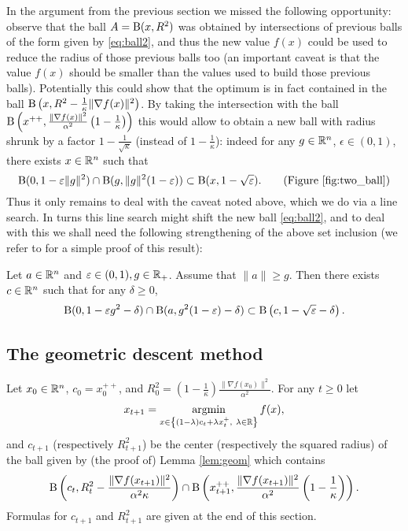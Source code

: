 In the argument from the previous section we missed the following opportunity: observe that the ball $A=\mathrm{B}(x,R^2)$ was obtained by intersections of previous balls of the form given by \eqref{eq:ball2}, and thus the new value $f(x)$ could be used to reduce the radius of those previous balls too (an important caveat is that the value $f(x)$ should be smaller than the values used to build those previous balls). Potentially this could show that the optimum is in fact contained in the ball $\mathrm{B}\left(x, R^2 - \frac{1}{\kappa} \|\nabla f(x)\|^2\right)$. By taking the intersection with the ball $\mathrm{B}\left(x^{++}, \frac{\|\nabla f(x)\|^2}{\alpha^2} \left(1 - \frac{1}{\kappa}\right)\right)$ this would allow to obtain a new ball with radius shrunk by a factor $1- \frac{1}{\sqrt{\kappa}}$ (instead of $1 - \frac{1}{\kappa}$): indeed for any $g \in \mathbb{R}^n$, $\epsilon \in (0,1)$, there exists $x \in \mathbb{R}^n$ such that
$$\mathrm{B}(0,1 - \varepsilon \|g\|^2) \cap \mathrm{B}(g, \|g\|^2 (1- \varepsilon)) \subset \mathrm{B}(x, 1-\sqrt{\varepsilon}) . \quad \quad \text{(Figure \ref{fig:two_ball})}$$
Thus it only remains to deal with the caveat noted above, which we do via a line search. In turns this line search might shift the new ball \eqref{eq:ball2}, and to deal with this we shall need the following strengthening of the above set inclusion (we refer to \cite{BLS15} for a simple proof of this result):
\begin{lemma} \label{lem:geom}
Let $a \in \mathbb{R}^n$ and $\varepsilon \in (0,1), g \in \mathbb{R}_+$. Assume that $\|a\| \geq g$. Then there exists $c \in \mathbb{R}^n$ such that for any $\delta \geq 0$,
$$\mathrm{B}(0,1 - \varepsilon g^2 - \delta) \cap \mathrm{B}(a, g^2(1-\varepsilon) - \delta) \subset \mathrm{B}\left(c, 1 - \sqrt{\varepsilon} - \delta \right) .$$
\end{lemma}

\subsection{The geometric descent method} \label{sec:GeoDmethod}
Let $x_0 \in \mathbb{R}^n$, $c_0 = x_0^{++}$, and $R_0^2 = \left(1 - \frac{1}{\kappa}\right)\frac{\|\nabla f(x_0)\|^2}{\alpha^2}$. For any $t \geq 0$ let
$$x_{t+1} = \mathop{\mathrm{argmin}}_{x \in \left\{(1-\lambda) c_t + \lambda x_t^+, \ \lambda \in \mathbb{R} \right\}} f(x) ,$$
and $c_{t+1}$ (respectively $R^2_{t+1}$) be the center (respectively the squared radius) of the ball given by (the proof of) Lemma \ref{lem:geom} which contains
$$\mathrm{B}\left(c_t, R_t^2 - \frac{\|\nabla f(x_{t+1})\|^2}{\alpha^2 \kappa}\right) \cap \mathrm{B}\left(x_{t+1}^{++}, \frac{\|\nabla f(x_{t+1})\|^2}{\alpha^2} \left(1 - \frac{1}{\kappa}\right) \right).$$
Formulas for $c_{t+1}$ and $R^2_{t+1}$ are given at the end of this section.

